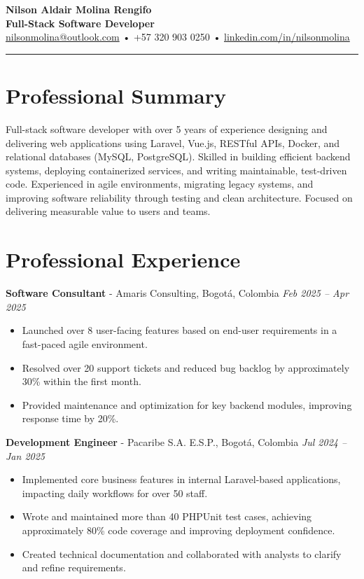 \documentclass[10.5pt,letterpaper]{article}
\begin{document}
	
	\begin{center}
		{\LARGE \textbf{Nilson Aldair Molina Rengifo}}\\[4pt]
		\textbf{Full-Stack Software Developer}\\[6pt]
		\href{mailto:nilsonmolina@outlook.com}{nilsonmolina@outlook.com} • +57 320 903 0250 • 
		\href{https://linkedin.com/in/nilsonmolina}{linkedin.com/in/nilsonmolina}
	\end{center}
	
	\hrule
	\vspace{0.5em}
	
	\section*{Professional Summary}
	Full-stack software developer with over 5 years of experience designing and delivering web applications using Laravel, Vue.js, RESTful APIs, Docker, and relational databases (MySQL, PostgreSQL). Skilled in building efficient backend systems, deploying containerized services, and writing maintainable, test-driven code. Experienced in agile environments, migrating legacy systems, and improving software reliability through testing and clean architecture. Focused on delivering measurable value to users and teams.
	
	\section*{Professional Experience}
	
	\textbf{Software Consultant} - Amaris Consulting, Bogotá, Colombia
	\hfill
	\textit{Feb 2025 – Apr 2025}
	\begin{itemize}
		\item Launched over 8 user-facing features based on end-user requirements in a fast-paced agile environment.
		\item Resolved over 20 support tickets and reduced bug backlog by approximately 30\% within the first month.
		\item Provided maintenance and optimization for key backend modules, improving response time by 20\%.
	\end{itemize}
	
	\textbf{Development Engineer} - Pacaribe S.A. E.S.P., Bogotá, Colombia
	\hfill
	\textit{Jul 2024 – Jan 2025}
	\begin{itemize}
		\item Implemented core business features in internal Laravel-based applications, impacting daily workflows for over 50 staff.
		\item Wrote and maintained more than 40 PHPUnit test cases, achieving approximately 80\% code coverage and improving deployment confidence.
		\item Created technical documentation and collaborated with analysts to clarify and refine requirements.
	\end{itemize}
	
\end{document}
